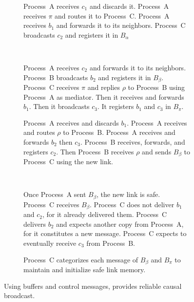 \begin{figure}
\begin{center}
\begin{subfigure}[t]{0.48\textwidth}
      \centering%
      \caption{\label{fig:solveF}Process~A receives $c_1$ and discards it.
        Process~A receives $\pi$ and routes it to Process~C. Process~A receives
        $b_1$ and forwards it to its neighbors. Process~C broadcasts $c_2$ and
        registers it in $B_\alpha$}
    \end{subfigure}
    ~
    \begin{subfigure}[t]{0.48\textwidth}
      \centering%
      \caption{\label{fig:solveG}Process~A receives $c_2$ and forwards it to
        its neighbors.  Process~B broadcasts $b_2$ and registers it in
        $B_\beta$. Process~C receives $\pi$ and replies $\rho$ to Process~B
        using Process~A as mediator. Then it receives and forwards $b_1$. Then
        it broadcasts $c_3$. It registers $b_1$ and $c_3$ in $B_\pi$.}
    \end{subfigure}
    \begin{subfigure}[t]{0.48\textwidth}
      \centering%
      \caption{\label{fig:solveH}Process~A receives and discards $b_1$.
        Process~A receives and routes $\rho$ to Process~B.  Process~A receives
        and forwards $b_2$ then $c_3$. Process~B receives, forwards, and
        registers $c_2$. Then Process~B receives $\rho$ and sends $B_\beta$ to
        Process~C using the new link.}
    \end{subfigure}
    ~
    \begin{subfigure}[t]{0.48\textwidth}
      \centering%
      \caption{\label{fig:solveI}Once Process~A sent $B_\beta$, the new link is
        safe.  Process~C receives $B_\beta$. Process~C does not deliver $b_1$
        and $c_2$, for it already delivered them. Process~C delivers $b_2$ and
        expects another copy from Process~A, for it constitutes a new message.
        Process~C expects to eventually receive $c_3$ from Process~B.}
    \end{subfigure}
    \begin{subfigure}[t]{0.99\textwidth}
      \centering%
      \caption{\label{fig:solveJ}Process~C categorizes each message of $B_\beta$
        and $B_\pi$ to maintain and initialize safe link memory.}
    \end{subfigure}
    \caption{\label{fig:solve}Using buffers and control messages, \RPCBROADCAST 
      provides reliable causal broadcast.}
  \end{center}
\end{figure}

